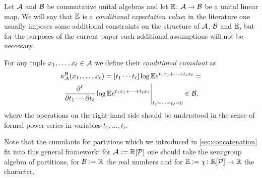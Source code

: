\documentclass[12pt,usenames,dvipsnames,svgnames,table]{amsart}
\begin{document}
Let $\mathcal{A}$ and $\mathcal{B}$ be commutative unital algebras 
and let $\mathbb{E}\colon\mathcal{A}\to\mathcal{B}$ be a unital linear map.
We will say that $\mathbb{E}$ is a \emph{conditional expectation value}; 
in the literature one usually imposes some additional constraints on the structure of $\mathcal{A}$,
$\mathcal{B}$ and $\mathbb{E}$, 
but for the purposes of the current paper such additional assumptions will not be necessary.

For any tuple $x_1,\dots,x_\ell \in\mathcal{A}$ we define their \emph{conditional cumulant} as
\begin{multline*} \kappa_{\mathcal{A}}^{\mathcal{B}}(x_1,\dots,x_\ell) =  
[t_1 \cdots t_\ell] \log \mathbb{E} e^{t_1 x_1+\dots+t_\ell x_\ell} = \\
\left. \frac{\partial^\ell}{\partial t_1 \cdots \partial t_\ell}
\log \mathbb{E} e^{t_1 x_1+\dots+t_\ell x_\ell} \right|_{t_1=\cdots=t_\ell=0}
\in \mathcal{B},
\end{multline*}
where the operations on the right-hand side should be understood 
in the sense of formal power series in variables
$t_1,\dots,t_\ell$.

\medskip

Note that the cumulants for partitions which we introduced in \cref{sec:concatenation}
fit into this general framework: for $\mathcal{A}:=\mathbb{R}[\mathcal{P}]$ one should take
the semigroup algebra of partitions, for $\mathcal{B}:=\mathbb{R}$ the real numbers   
and for $\mathbb{E}:=\chi\colon\mathbb{R}[\mathcal{P}]\to\mathbb{R}$ the character.
\end{document}
